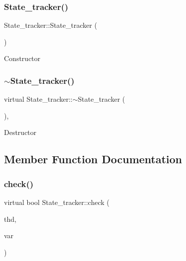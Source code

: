 \subsubsection{\texorpdfstring{State\+\_\+tracker()}{State\_tracker()}}
{\footnotesize\ttfamily State\+\_\+tracker\+::\+State\+\_\+tracker (\begin{DoxyParamCaption}{ }\end{DoxyParamCaption})\hspace{0.3cm}{\ttfamily [inline]}}

Constructor \mbox{\label{classState__tracker_aa5166c8da02624bae36ec7871d411af9}} 
\subsubsection{\texorpdfstring{$\sim$\+State\+\_\+tracker()}{~State\_tracker()}}
{\footnotesize\ttfamily virtual State\+\_\+tracker\+::$\sim$\+State\+\_\+tracker (\begin{DoxyParamCaption}{ }\end{DoxyParamCaption})\hspace{0.3cm}{\ttfamily [inline]}, {\ttfamily [virtual]}}

Destructor 

\subsection{Member Function Documentation}
\mbox{\label{classState__tracker_a50923266a6300e657b70dc4f0125782c}} 
\subsubsection{\texorpdfstring{check()}{check()}}
{\footnotesize\ttfamily virtual bool State\+\_\+tracker\+::check (\begin{DoxyParamCaption}\item[{T\+HD $\ast$}]{thd,  }\item[{\mbox{\hyperlink{classset__var}{set\+\_\+var}} $\ast$}]{var }\end{DoxyParamCaption})\hspace{0.3cm}{\ttfamily [pure virtual]}}

